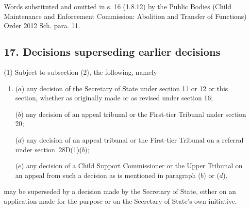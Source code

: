 \documentclass[a4paper]{article}
\begin{document}
{

Words substituted and omitted in s. 16 (1.8.12) by the Public Bodies (Child Maintenance and Enforcement
Commission: Abolition and Transfer of Functions) Order 2012 Sch. para. 11.

}

\subsection{17. Decisions superseding earlier decisions}

(1) Subject to subsection (2), the following, namely---
\begin{enumerate}\item[]
($a$) any decision of the Secretary of State under section 11 or 12 or this section,
whether as originally made or as revised under section 16;

($b$) any decision of 
an appeal tribunal or  %
the First-tier Tribunal under section 20;

($d$) any decision of 
an appeal tribunal or  %
the First-tier Tribunal on a referral under section~28D(1)($b$);

($e$) any decision of 
a Child Support Commissioner or  %
the Upper Tribunal on an appeal from such a decision as
is mentioned in paragraph ($b$) or ($d$),
\end{enumerate}
may be superseded by a decision made by the Secretary of State, either on an application made for the purpose or on the Secretary of State’s own initiative.

\end{document}
